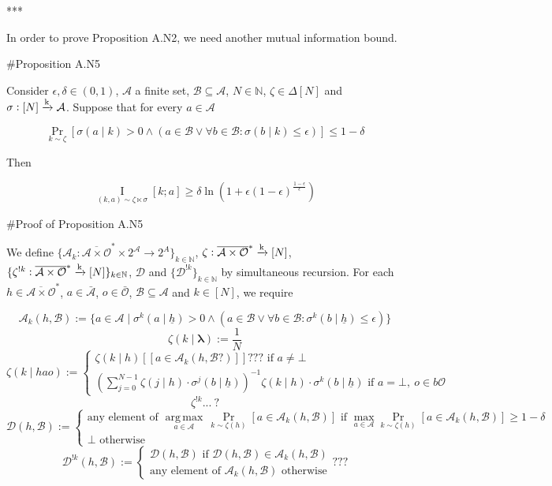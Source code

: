 \documentclass[a4paper]{article}
\newcommand{\AP}[1]{\left(#1\right)}
\newcommand{\AB}[1]{\left[#1\right]}
\newcommand{\Pa}[2]{\underset{#1}{\operatorname{Pr}}\AB{#2}}
\newcommand{\Ia}[2]{\underset{#1}{\operatorname{I}}\AB{#2}}
\newcommand{\Argmax}[1]{\underset{#1}{\operatorname{arg\,max}}\,}
\newcommand{\Nats}{\mathbb{N}}
\newcommand{\Sq}[2]{\{#1\}_{#2 \in \Nats}}
\newcommand{\Estr}{\boldsymbol{\lambda}}
\newcommand{\M}{\xrightarrow{\textnormal{k}}}
\newcommand{\Ob}{\mathcal{O}}
\newcommand{\A}{\mathcal{A}}
\newcommand{\Ado}{\bar{\Ob}}
\newcommand{\Ada}{\bar{\A}}
\newcommand{\Adao}{\overline{\A \times \Ob}}
\newcommand{\Adfh}{\Adao^*}
\newcommand{\D}{\mathcal{D}}
\newcommand{\B}{\mathcal{B}}
\begin{document}
***

In order to prove Proposition A.N2, we need another mutual information bound.

\#Proposition A.N5

Consider $\epsilon,\delta \in (0,1)$, $\A$ a finite set, $\B \subseteq \A$, $N \in \Nats$, $\zeta \in \Delta[N]$ and $\sigma: [N] \M \A$. Suppose that for every $a \in \A$

$$\Pa{k \sim \zeta}{\sigma(a \mid k) > 0 \land \AP{a \in \B \lor \forall b \in \B: \sigma(b \mid k) \leq \epsilon}} \leq 1 - \delta$$

Then

$$\Ia{(k,a)\sim\zeta\ltimes\sigma}{k;a} \geq \delta \ln\left(1 + \epsilon(1-\epsilon)^{\frac{1-\epsilon}{\epsilon}}\right)$$

\#Proof of Proposition A.N5

We define $\Sq{\A_k: \Adfh \times 2^\A \rightarrow 2^A}{k}$, $\zeta: \Adfh \M [N]$, $\Sq{\zeta^{!k}: \Adfh \M [N]}{k}$, $\D$ and $\Sq{\D^{!k}}{k}$ by simultaneous recursion. For each $h \in \Adfh$, $a \in \Ada$, $o \in \Ado$, $\B \subseteq \A$ and $k \in [N]$, we require

$$\A_k(h, \B):=\{a \in \A \mid \sigma^k\AP{a \mid \underline{h}} > 0 \land \AP{a \in \B \lor \forall b \in \B: \sigma^k\AP{b \mid \underline{h}} \leq \epsilon}\}$$
%
$$\zeta(k \mid \Estr):=\frac{1}{N}$$
%
$$\zeta(k \mid hao):=\begin{cases} \zeta(k \mid h)[[a \in \A_k(h,\B?)]]??? \text{ if } a\ne\bot \\ \AP{\sum_{j=0}^{N-1} \zeta(j \mid h)\cdot \sigma^j\AP{b \mid \underline{h}}}^{-1} \zeta(k \mid h)\cdot \sigma^k\AP{b \mid \underline{h}} \text{ if } a = \bot,\ o \in b\Ob \end{cases}$$
%
$$\zeta^{!k}...\ ?$$
%
$$\D(h,\B) := \begin{cases} \text{any element of } \Argmax{a \in \A} \Pa{k\sim\zeta(h)}{a \in \A_k(h,\B)} \text{ if } \max_{a \in \A} \Pa{k\sim\zeta(h)}{a \in \A_k(h,\B)} \geq 1-\delta \\ \bot \text{ otherwise} \end{cases}$$
%
$$\D^{!k}(h,\B):=\begin{cases} \D(h,\B) \text{ if } \D(h,\B) \in \A_k(h,\B) \\ \text{any element of } \A_k(h,\B) \text{ otherwise} \end{cases}???$$

\end{document}
